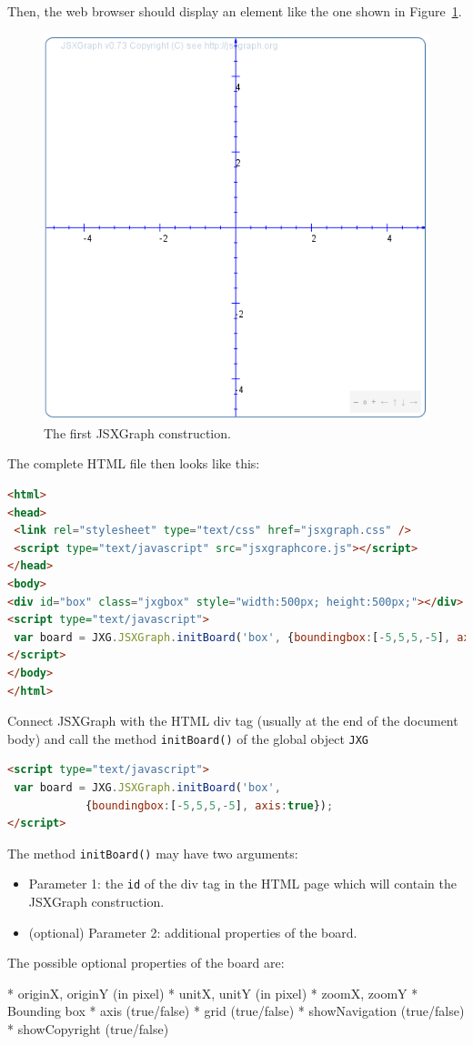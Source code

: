 \documentclass[a4paper,nols]{tufte-book}
\begin{document}
Then, the web browser should display an element like the one shown in Figure~\ref{fig:1}.
\begin{figure}[htb]
\centerline{\includegraphics[width=0.4\linewidth]{images/b2.png}}
\caption{The first JSXGraph construction.}\label{fig:1}
\end{figure}

The complete HTML file then looks like this:
\begin{fullwidth}\begin{lstlisting}[language=HTML]
<html>
<head>
 <link rel="stylesheet" type="text/css" href="jsxgraph.css" />
 <script type="text/javascript" src="jsxgraphcore.js"></script>
</head>
<body>
<div id="box" class="jxgbox" style="width:500px; height:500px;"></div>
<script type="text/javascript">
 var board = JXG.JSXGraph.initBoard('box', {boundingbox:[-5,5,5,-5], axis:true});
</script>
</body>
</html>
\end{lstlisting}\end{fullwidth}
Connect JSXGraph with the HTML div tag (usually at the end of the document body) and call 
the method \lstinline|initBoard()| of the global object \lstinline|JXG|

\begin{lstlisting}[language=HTML]
<script type="text/javascript">
 var board = JXG.JSXGraph.initBoard('box', 
            {boundingbox:[-5,5,5,-5], axis:true});
</script>
\end{lstlisting}
The method \lstinline|initBoard()| may have two arguments:
\begin{itemize}
    \item Parameter 1: the \lstinline|id| of the div tag in the HTML page which will contain the JSXGraph construction.
    \item (optional) Parameter 2: additional properties of the board. 
\end{itemize}
The possible optional properties of the board are:

    * originX, originY (in pixel)
    * unitX, unitY (in pixel)
    * zoomX, zoomY
    * Bounding box
    * axis (true/false)
    * grid (true/false)
    * showNavigation (true/false)
    * showCopyright (true/false) 
\end{document}
